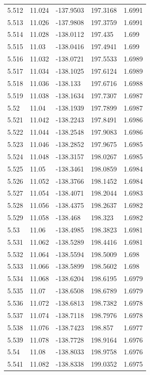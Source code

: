 \begin{tabular}{lllll}
5.512 & 11.024 & -137.9503 & 197.3168 & 1.6991 \\
5.513 & 11.026 & -137.9808 & 197.3759 & 1.6991 \\
5.514 & 11.028 & -138.0112 & 197.435 & 1.699 \\
5.515 & 11.03 & -138.0416 & 197.4941 & 1.699 \\
5.516 & 11.032 & -138.0721 & 197.5533 & 1.6989 \\
5.517 & 11.034 & -138.1025 & 197.6124 & 1.6989 \\
5.518 & 11.036 & -138.133 & 197.6716 & 1.6988 \\
5.519 & 11.038 & -138.1634 & 197.7307 & 1.6987 \\
5.52 & 11.04 & -138.1939 & 197.7899 & 1.6987 \\
5.521 & 11.042 & -138.2243 & 197.8491 & 1.6986 \\
5.522 & 11.044 & -138.2548 & 197.9083 & 1.6986 \\
5.523 & 11.046 & -138.2852 & 197.9675 & 1.6985 \\
5.524 & 11.048 & -138.3157 & 198.0267 & 1.6985 \\
5.525 & 11.05 & -138.3461 & 198.0859 & 1.6984 \\
5.526 & 11.052 & -138.3766 & 198.1452 & 1.6984 \\
5.527 & 11.054 & -138.4071 & 198.2044 & 1.6983 \\
5.528 & 11.056 & -138.4375 & 198.2637 & 1.6982 \\
5.529 & 11.058 & -138.468 & 198.323 & 1.6982 \\
5.53 & 11.06 & -138.4985 & 198.3823 & 1.6981 \\
5.531 & 11.062 & -138.5289 & 198.4416 & 1.6981 \\
5.532 & 11.064 & -138.5594 & 198.5009 & 1.698 \\
5.533 & 11.066 & -138.5899 & 198.5602 & 1.698 \\
5.534 & 11.068 & -138.6204 & 198.6195 & 1.6979 \\
5.535 & 11.07 & -138.6508 & 198.6789 & 1.6979 \\
5.536 & 11.072 & -138.6813 & 198.7382 & 1.6978 \\
5.537 & 11.074 & -138.7118 & 198.7976 & 1.6978 \\
5.538 & 11.076 & -138.7423 & 198.857 & 1.6977 \\
5.539 & 11.078 & -138.7728 & 198.9164 & 1.6976 \\
5.54 & 11.08 & -138.8033 & 198.9758 & 1.6976 \\
5.541 & 11.082 & -138.8338 & 199.0352 & 1.6975 \\

\end{tabular}
